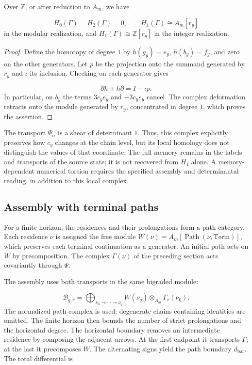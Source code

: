 \begin{proposition}
\label{hmtfg:base:prop:continuo-homologia-memoria}
Over \(\mathbb Z\), or after reduction to \(A_m\), we have

\[
H_0(\Gamma)=H_2(\Gamma)=0,
\qquad H_1(\Gamma)\cong A_m[r_y]
\]
in the modular realization, and \(H_1(\Gamma)\cong\mathbb Z[r_y]\) in the integer realization.
\end{proposition}
\begin{proof}
Define the homotopy of degree \(1\) by \(h(g_y)=e_y\), \(h(b_y)=f_y\), and zero on the other generators. Let \(p\) be the projection onto the summand generated by \(r_y\) and \(\iota\) its inclusion. Checking on each generator gives

\[
\partial h+h\partial=I-\iota p.
\]
In particular, on \(b_y\) the terms \(3c_ye_y\) and \(-3c_ye_y\) cancel. The complex deformation retracts onto the module generated by \(r_y\), concentrated in degree \(1\), which proves the assertion.
\end{proof}

The transport \(\Psi_\alpha\) is a shear of determinant \(1\). Thus, this complex explicitly preserves how \(c_y\) changes at the chain level, but its local homology does not distinguish the values of that coordinate. The full memory remains in the labels and transports of the source state; it is not recovered from \(H_1\) alone. A memory-dependent numerical torsion requires the specified assembly and determinantal reading, in addition to this local complex.

\subsection{Assembly with terminal paths}
For a finite horizon, the residences and their prolongations form a path category. Each residence \(\nu\) is assigned the free module \(W(\nu)=A_m[\operatorname{Path}(\nu,\mathrm{Term})]\), which preserves each terminal continuation as a generator. An initial path acts on \(W\) by precomposition. The complex \(\Gamma(\nu)\) of the preceding section acts covariantly through \(\Psi\).

The assembly uses both transports in the same bigraded module:

\[
\mathcal B_{q,r}=
\bigoplus_{\nu_0\to\cdots\to\nu_q}
W(\nu_q)\otimes_{A_m}\Gamma_r(\nu_0).
\]
The normalized path complex is used: degenerate chains containing identities are omitted. The finite horizon then bounds the number of strict prolongations and the horizontal degree. The horizontal boundary removes an intermediate residence by composing the adjacent arrows. At the first endpoint it transports \(\Gamma\); at the last it precomposes \(W\). The alternating signs yield the path boundary \(d_{\mathrm{bar}}\). The total differential is

